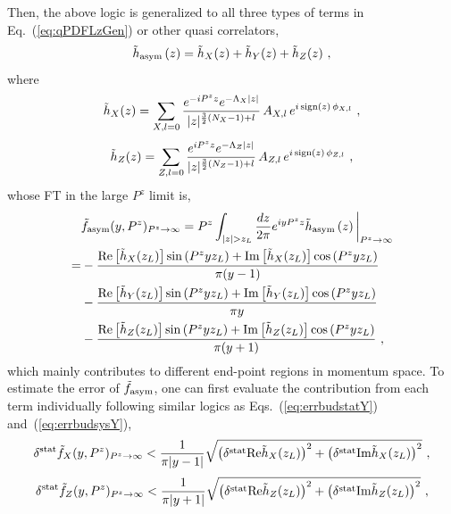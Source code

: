 \documentclass[a4paper,11pt]{article}
\begin{document}
Then, the above logic is generalized to all three types of terms in Eq.~(\ref{eq:qPDFLzGen}) or other quasi correlators, 
\begin{align}
\tilde{h}_{\rm asym}\left(z\right) = 
\tilde{h}_{X}(z)  + \tilde{h}_{Y}(z) 
+ \tilde{h}_{Z}(z)  \ ,
\end{align}
where
\begin{align}
\tilde{h}_{X}(z) =  \sum_{X,l=0} \frac{e^{-i P^z z} e^{-\Lambda_X |z| }}{|z|^{\frac{3}{2}(N_X-1)+l}} \, A_{X,l} \, e^{i \, {\rm sign}(z) \, \phi_{X,l}}   \ ,
\end{align}
\begin{align}
\tilde{h}_{Z}(z) =  \sum_{Z,l=0} \frac{e^{i P^z z} e^{-\Lambda_Z |z|}}{|z|^{\frac{3}{2}(N_Z-1)+l}} \, A_{Z,l} \, e^{i \, {\rm sign}(z) \, \phi_{Z,l}}   \ ,
\end{align}
whose FT in the large $P^z$ limit is,
\begin{align}
&\tilde f_{\rm asym}(y,P^z)_{P^z \rightarrow\infty} 
= P^z \int_{|z|>z_L} \frac{d z}{2\pi} e^{i y P^z z} \tilde{h}_{\rm asym}\left(z\right) \bigg|_{P^z \rightarrow \infty} \nonumber\\
=&-\frac{{\rm Re}\left[\tilde{h}_X(z_L)\right] \sin \left(P^z y z_L\right) + {\rm Im}\left[\tilde{h}_X(z_L)\right] \cos \left(P^z y z_L\right)}{\pi (y-1)} \nonumber\\
&-\frac{{\rm Re}\left[\tilde{h}_Y(z_L)\right] \sin \left(P^z y z_L\right) + {\rm Im}\left[\tilde{h}_Y(z_L)\right] \cos \left(P^z y z_L\right)}{\pi y} \nonumber\\
&-\frac{{\rm Re}\left[\tilde{h}_Z(z_L)\right] \sin \left(P^z y z_L\right) + {\rm Im}\left[\tilde{h}_Z(z_L)\right] \cos \left(P^z y z_L\right)}{\pi (y+1)}\ ,
\end{align}
which mainly contributes to different end-point regions in momentum space. To estimate the error of $\tilde f_{\rm asym}$, one can first evaluate the contribution from each term individually following similar logics as Eqs.~(\ref{eq:errbudstatY}) and~(\ref{eq:errbudsysY}), 
\begin{align}\label{eq:errbudstatX}
\delta^{\rm stat} \tilde f_{X}(y,P^z)_{P^z \rightarrow\infty}  <  \frac{1}{\pi |y-1|} \sqrt{\left(\delta^{\rm stat}{\rm Re}\tilde{h}_{X}(z_L)\right)^2 + \left(\delta^{\rm stat}{\rm Im}\tilde{h}_{X}(z_L)\right)^2} \ ,
\end{align}
\begin{align}\label{eq:errbudstatZ}
\delta^{\rm stat} \tilde f_{Z}(y,P^z)_{P^z \rightarrow\infty}  <  \frac{1}{\pi |y+1|} \sqrt{\left(\delta^{\rm stat}{\rm Re}\tilde{h}_{Z}(z_L)\right)^2 + \left(\delta^{\rm stat}{\rm Im}\tilde{h}_{Z}(z_L)\right)^2} \ ,
\end{align}
\end{document}
